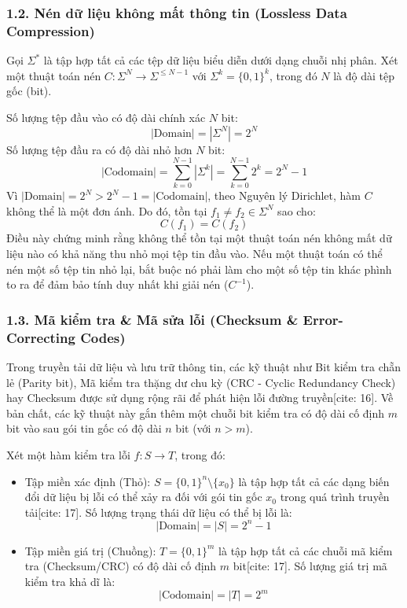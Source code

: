 \documentclass[12pt,a4paper]{article}
\theoremstyle{definition}
\begin{document}
\subsubsection*{1.2. Nén dữ liệu không mất thông tin (Lossless Data Compression)}
Gọi $\Sigma^*$ là tập hợp tất cả các tệp dữ liệu biểu diễn dưới dạng chuỗi nhị phân. Xét một thuật toán nén $C: \Sigma^N \to \Sigma^{\le N-1}$ với $\Sigma^k = \{0,1\}^k$, trong đó $N$ là độ dài tệp gốc (bit).

\noindent Số lượng tệp đầu vào có độ dài chính xác $N$ bit:
\[
|\text{Domain}| = |\Sigma^N| = 2^N
\]
Số lượng tệp đầu ra có độ dài nhỏ hơn $N$ bit:
\[
|\text{Codomain}| = \sum_{k=0}^{N-1} |\Sigma^k| = \sum_{k=0}^{N-1} 2^k = 2^N - 1
\]
Vì $|\text{Domain}| = 2^N > 2^N - 1 = |\text{Codomain}|$, theo Nguyên lý Dirichlet, hàm $C$ không thể là một đơn ánh. Do đó, tồn tại $f_1 \neq f_2 \in \Sigma^N$ sao cho:
\[
C(f_1) = C(f_2)
\]
Điều này chứng minh rằng không thể tồn tại một thuật toán nén không mất dữ liệu nào có khả năng thu nhỏ mọi tệp tin đầu vào. Nếu một thuật toán có thể nén một số tệp tin nhỏ lại, bắt buộc nó phải làm cho một số tệp tin khác phình to ra để đảm bảo tính duy nhất khi giải nén ($C^{-1}$).

\subsubsection*{1.3. Mã kiểm tra \& Mã sửa lỗi (Checksum \& Error-Correcting Codes)}
Trong truyền tải dữ liệu và lưu trữ thông tin, các kỹ thuật như Bit kiểm tra chẵn lẻ (Parity bit), Mã kiểm tra thặng dư chu kỳ (CRC - Cyclic Redundancy Check) hay Checksum được sử dụng rộng rãi để phát hiện lỗi đường truyền[cite: 16]. Về bản chất, các kỹ thuật này gắn thêm một chuỗi bit kiểm tra có độ dài cố định $m$ bit vào sau gói tin gốc có độ dài $n$ bit (với $n > m$).

\noindent Xét một hàm kiểm tra lỗi $f: S \to T$, trong đó:
\begin{itemize}[leftmargin=1.2cm, itemsep=3pt, topsep=2pt]
    \item Tập miền xác định (Thỏ): $S = \{0,1\}^n \setminus \{x_0\}$ là tập hợp tất cả các dạng biến đổi dữ liệu bị lỗi có thể xảy ra đối với gói tin gốc $x_0$ trong quá trình truyền tải[cite: 17]. Số lượng trạng thái dữ liệu có thể bị lỗi là:
    \[
    |\text{Domain}| = |S| = 2^n - 1
    \]
    \item Tập miền giá trị (Chuồng): $T = \{0,1\}^m$ là tập hợp tất cả các chuỗi mã kiểm tra (Checksum/CRC) có độ dài cố định $m$ bit[cite: 17]. Số lượng giá trị mã kiểm tra khả dĩ là:
    \[
    |\text{Codomain}| = |T| = 2^m
    \]
\end{itemize}
\end{document}
